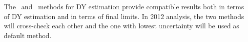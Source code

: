 The \zm\ and \routin\ methods for DY estimation provide compatible results both in terms of DY estimation and in terms of final limits.
In 2012 analysis, the two methods will cross-check each other and the one with lowest uncertainty will be used as default method.
